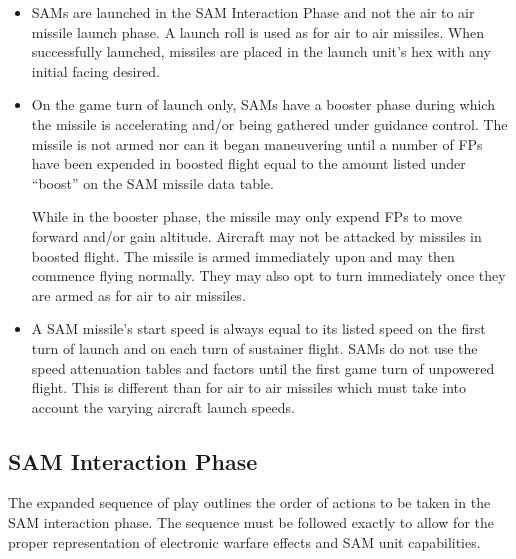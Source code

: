 \begin{itemize}

    \item{} SAMs are launched in the SAM Interaction Phase and not the air to air missile launch phase. A launch roll is used as for air to air missiles. When successfully launched, missiles are placed in the launch unit's hex with any initial facing desired.

    \item{} On the game turn of launch only, SAMs have a booster phase during which the missile is accelerating and/or being gathered under guidance control. The missile is not armed nor can it began maneuvering until a number of FPs have been expended in boosted flight equal to the amount listed under “boost” on the SAM missile data table.

        While in the booster phase, the missile may only expend FPs to move forward and/or gain altitude. Aircraft may not be attacked by missiles in boosted flight. The missile is armed immediately upon  and may then commence flying normally. They may also opt to turn immediately once they are armed as for air to air missiles.

    \item{} A SAM missile's start speed is always equal to its listed speed on the first turn of launch and on each turn of sustainer flight. SAMs do not use the speed attenuation tables and factors until the first game turn of unpowered flight. This is different than for air to air missiles which must take into account the varying aircraft launch speeds. 

\end{itemize}


\subsection{SAM Interaction Phase} The expanded sequence of play outlines the order of actions to be taken in the SAM interaction phase. The sequence must be followed exactly to allow for the proper representation of electronic warfare effects and SAM unit capabilities.

